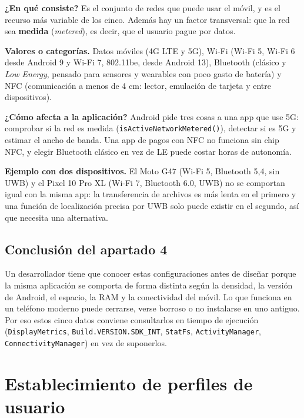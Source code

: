 \documentclass[11pt,a4paper]{article}
\newcommand{\code}[1]{\texttt{\color{navylight}#1}}
\newcommand{\campo}[1]{\textbf{\color{navy}#1}}
\begin{document}
	\campo{¿En qué consiste?}
	Es el conjunto de redes que puede usar el móvil, y es el recurso más variable de los cinco. Además hay un factor transversal: que la red sea \textbf{medida} (\emph{metered}), es decir, que el usuario pague por datos.

	\campo{Valores o categorías.} Datos móviles (4G LTE y 5G), Wi-Fi (Wi-Fi 5, Wi-Fi 6 desde Android 9 y Wi-Fi 7, 802.11be, desde Android 13), Bluetooth (clásico y \emph{Low Energy}, pensado para sensores y wearables con poco gasto de batería) y NFC (comunicación a menos de 4 cm: lector, emulación de tarjeta y entre dispositivos).

	\campo{¿Cómo afecta a la aplicación?}
	Android pide tres cosas a una app que use 5G: comprobar si la red es medida (\code{isActiveNetworkMetered()}), detectar si es 5G y estimar el ancho de banda. Una app de pagos con NFC no funciona sin chip NFC, y elegir Bluetooth clásico en vez de LE puede costar horas de autonomía.

	\campo{Ejemplo con dos dispositivos.} El Moto G47 (Wi-Fi 5, Bluetooth 5,4, sin UWB) y el Pixel 10 Pro XL (Wi-Fi 7, Bluetooth 6.0, UWB) no se comportan igual con la misma app: la transferencia de archivos es más lenta en el primero y una función de localización precisa por UWB solo puede existir en el segundo, así que necesita una alternativa.

	\subsection{Conclusión del apartado 4}

	Un desarrollador tiene que conocer estas configuraciones antes de diseñar porque la misma aplicación se comporta de forma distinta según la densidad, la versión de Android, el espacio, la RAM y la conectividad del móvil. Lo que funciona en un teléfono moderno puede cerrarse, verse borroso o no instalarse en uno antiguo. Por eso estos cinco datos conviene consultarlos en tiempo de ejecución (\code{DisplayMetrics}, \code{Build.VERSION.SDK\_INT}, \code{StatFs}, \code{ActivityManager}, \code{ConnectivityManager}) en vez de suponerlos.

	\section{Establecimiento de perfiles de usuario}
\end{document}
